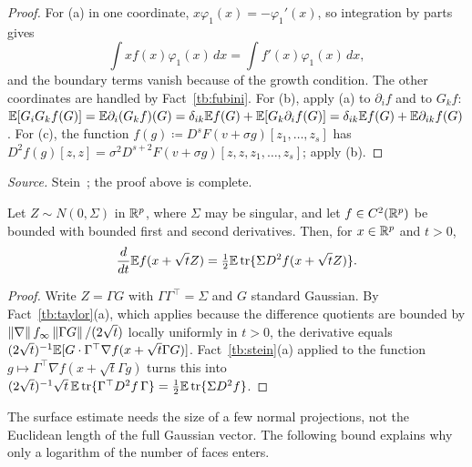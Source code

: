 \begin{proof}
For (a) in one coordinate, \(x\varphi_1(x)=-\varphi_1'(x)\), so integration by
parts gives
\[\int xf(x)\varphi_1(x)\,dx=\int f'(x)\varphi_1(x)\,dx,\]
and the boundary terms vanish because of the growth condition. The other coordinates
are handled by Fact~\ref{tb:fubini}. For (b), apply (a) to \(\partial_if\) and
to \(G_kf\): \(\mathbb E[G_iG_kf(G)]=\mathbb E\partial_i(G_kf)(G)=\delta_{ik}\mathbb E f(G)
+\mathbb E[G_k\partial_if(G)]=\delta_{ik}\mathbb E f(G)+\mathbb E\partial_{ik}f(G)\). For (c), the
function \(f(g)\coloneqq D^sF(v+\sigma g)[z_1,\ldots,z_s]\) has
\(D^2f(g)[z,z]=\sigma^2D^{s+2}F(v+\sigma g)[z,z,z_1,\ldots,z_s]\); apply (b).
\end{proof}

\emph{Source.} Stein~; the proof above is complete.

\begin{fact}\label{tb:heat}
Let \(Z\sim N(0,\Sigma)\) in \(\mathbb R^p\), where \(\Sigma\) may be singular, and
let \(f\in C^2(\mathbb R^p)\) be bounded with bounded first and second derivatives.
Then, for \(x\in\mathbb R^p\) and \(t>0\),
\[
 \frac d{dt}\mathbb E f(x+\sqrt t Z)
 =\tfrac12\mathbb E\operatorname{tr}\{\Sigma D^2f(x+\sqrt t Z)\}.
\]
\end{fact}

\begin{proof}
Write \(Z=\Gamma G\) with \(\Gamma\Gamma^\top=\Sigma\) and \(G\) standard
Gaussian. By Fact~\ref{tb:taylor}(a), which applies because the difference
quotients are bounded by \(\left\lVert\nabla\right\rVert f_\infty\left\lVert\Gamma G\right\rVert/(2\sqrt t)\)
locally uniformly in \(t>0\), the derivative equals
\((2\sqrt t)^{-1}\mathbb E[G\cdot\Gamma^\top\nabla f(x+\sqrt t\Gamma G)]\).
Fact~\ref{tb:stein}(a) applied to the function \(g\mapsto
\Gamma^\top\nabla f(x+\sqrt t\Gamma g)\) turns this into
\((2\sqrt t)^{-1}\sqrt t\,\mathbb E\operatorname{tr}\{\Gamma^\top D^2f\,\Gamma\}
=\frac12\mathbb E\operatorname{tr}\{\Sigma D^2f\}\).
\end{proof}


The surface estimate needs the size of a few normal projections,
not the Euclidean length of the full Gaussian vector. The following
bound explains why only a logarithm of the number of faces enters.

